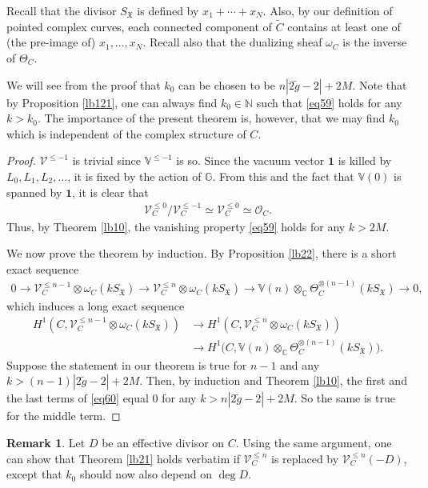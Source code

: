 \documentclass[12pt,b5paper,notitlepage]{report}
\theoremstyle{definition}
\newtheorem{rem}[df]{Remark}
\theoremstyle{plain}
\newcommand{\fk}{\mathfrak}
\newcommand{\wtd}{\widetilde}
\newcommand{\id}{\mathbf{1}}
\newcommand{\scr}{\mathscr}
\newcommand{\SX}{S_{\fk X}}
\newcommand{\Vbb}{\mathbb V}
\newcommand{\Gbb}{\mathbb G}
\newcommand{\Cbb}{\mathbb C}
\newcommand{\Nbb}{\mathbb N}
\numberwithin{equation}{section}
\begin{document}
Recall that the divisor $\SX$ is defined by $x_1+\cdots+x_N$. Also, by our definition of pointed complex curves, each connected component of $\wtd C$ contains at least one of (the pre-image of) $x_1,\dots,x_N$. Recall also that the dualizing sheaf $\omega_C$ is the inverse of $\Theta_C$.

We will see from the proof that $k_0$ can be chosen to be $n|2\wtd g-2|+2M$. Note that by Proposition \ref{lb121}, one can always find $k_0\in\Nbb$ such that \eqref{eq59} holds for any $k>k_0$. The importance of the present theorem is, however, that we may find $k_0$ which is independent of the complex structure of $C$.


\begin{proof}
$\scr V^{\leq -1}$ is trivial since $\Vbb^{\leq -1}$ is so. Since the vacuum vector $\id$ is killed by $L_0,L_1,L_2,\dots$, it is fixed by the action of $\Gbb$. From this and the fact that $\Vbb(0)$ is spanned by $\id$, it is clear that
\begin{align}
\scr V_C^{\leq 0}/\scr V_C^{\leq -1}\simeq \scr V_C^{\leq 0}\simeq \scr O_C.
\end{align}
Thus, by Theorem \ref{lb10},  the vanishing property \eqref{eq59} holds for any $k>2M$.

We now prove the theorem by induction. By Proposition \ref{lb22}, there is a  short exact sequence 
\begin{align*}
0\rightarrow \scr V_C^{\leq n-1}\otimes\omega_C(k\SX)\rightarrow \scr V_C^{\leq n}\otimes\omega_C(k\SX) \rightarrow \Vbb(n)\otimes_{\Cbb}\Theta_C^{\otimes(n-1)}(k\SX)\rightarrow 0,
\end{align*}
which induces a long exact sequence
\begin{align}
H^1(C,\scr V_C^{\leq n-1}\otimes\omega_C(k\SX))&\rightarrow H^1(C,\scr V_C^{\leq n}\otimes\omega_C(k\SX))\nonumber\\
&\rightarrow H^1\big(C,\Vbb(n)\otimes_{\Cbb}\Theta_C^{\otimes(n-1)}(k\SX)\big).\label{eq60}
\end{align}
Suppose the statement in our theorem is true for $n-1$ and any $k>(n-1)|2\wtd g-2|+2M$. Then, by  induction and Theorem \ref{lb10},  the first and the last terms of \eqref{eq60} equal $0$ for any $k>n|2\wtd g-2|+2M$. So the same is true for the middle term.
\end{proof}

\begin{rem}\label{lb88}
Let $D$ be an effective divisor on $C$. Using the same argument, one can show that Theorem \ref{lb21} holds verbatim if $\scr V_C^{\leq n}$ is replaced by $\scr V_C^{\leq n}(-D)$, except that $k_0$ should now also depend on $\deg D$.
\end{rem}
	
\end{document}
